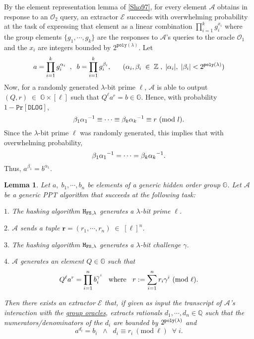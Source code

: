 \documentclass[11pt, lettersize, notitlepage, leqno, footskip=0.6cm]{article}
\newcommand{\bz}{\mathbb Z}
\newcommand{\bq}{\mathbb Q}
\newcommand{\pl}{\prod\limits}
\newcommand{\slim}{\sum\limits}
\newcommand{\ttt}{\texttt}
\newcommand{\bG}{\mathbb{G}}
\newcommand{\mc}{\mathcal}
\newcommand{\mb}{\mathbb}
\newcommand{\mbf}{\mathbf}
\newcommand{\al}{\alpha}
\newcommand{\be}{\beta}
\newcommand{\lam}{\lambda}
\newcommand{\A}{\mc{A}}
\newcommand{\vs}{\vspace{-0.15cm}}
\newcommand{\noin}{\noindent}
\newcommand{\op}{overwhelming probability}
\newcommand{\Mod}[1]{\ (\mathrm{mod}\ #1)}
\newcommand{\E}{\mc{E}}
\newtheorem{Lem}[Thm]{Lemma}
\numberwithin{equation}{section}
\begin{document}
\begin{prf} By the element representation lemma of \hyperlink{Sho97}{[Sho97]}, for every element $\mc{A}$ obtains in response to an $\mc{O}_2$ query, an extractor $\E$ succeeds with overwhelming probability at the task of expressing that element as a linear combination $\prod_{i=1}^k g_i^{x_i}$ where the group elements $\{g_1,\cdots,g_k\}$ are the responses to $\A$'s queries to the oracle $\mc{O}_1$ and the $x_i$ are integers bounded by $2^{\ttt{poly}(\lam)}$. Let \vspace{-0.3cm} $$a = \pl_{i=1}^k g_i^{\al_i}\;\;,\;\; b = \pl_{i=1}^k g_i^{\be_i},\;\;\;\;\;\;(\al_i,\be_i\;\in\;\bz\;,\;|\al_i|,\;|\be_{i}| < 2^{\ttt{poly}(\lam)})\vs $$ Now, for a randomly generated $\lam$-bit prime $\ell$, $\mc{A}$ is able to output $(Q, r)\; \in\;\bG \times [\ell]$ such that $Q^{\ell}a^r = b\in \bG$. Hence, with probability $1-\ttt{Pr}[\ttt{DLOG}]$,  \vs $${\be_1}{\al_1}^{-1}\equiv\cdots\equiv {\be_k}{\al_k}^{-1}\equiv r \Mod{l}.\vs $$ Since the $\lam$-bit prime $\ell$ was randomly generated, this implies that with \op, \vs $${\be_1}{\al_1}^{-1} = \cdots =  {\be_k}{\al_k}^{-1}.\vs $$ Thus, $a^{\be_1} = b^{\al_1}$. \end{prf}
\vspace{0.1cm}



\begin{Lem} \label{aggroot} Let $a,\; b_1,\cdots,b_n$ be elements of a generic hidden order group $\bG$. Let $\mc{A}$ be a generic PPT algorithm that succeeds at the following task:

\noin $1.$ The hashing algorithm ${\tt{H}}_{{\tt{FS}},\lam}$ generates a $\lam$-bit prime $\ell$.

\noin $2.$ $\mc{A}$ sends a tuple $\mbf{r} = (r_1,\cdots,r_n)\;\in\; [\ell]^n$.

\noin $3.$ The hashing algorithm ${\tt{H}}_{{\tt{FS}},\lam}$ generates a $\lam$-bit challenge $\gamma$.

\noin $4.$ $\mc{A}$ generates an element $Q\in \mb{G}$ such that \vs $$Q^{\ell}a^r = \pl_{i=1}^n b_i^{\gamma^i}\;\;\text{ where }\;\; r:= \slim_{i=1}^n r_i\gamma^i\Mod{\ell}. \vs $$

\noin Then there exists an extractor \hspace{0.05cm}$\E$ that, if given as input the transcript of $\A$'s interaction with the \hyperlink{Oracles}{group oracles}, extracts rationals $d_1,\cdots,d_n\in\bq$ such that the numerators/denominators of the $d_i$ are bounded by $2^{\tt{poly}(\lam)}$ and \vspace{-0.25cm} $$a^{d_i} = b_i \;\;\wedge\;\; d_i\equiv r_i\Mod{\ell}\;\;\forall\;i. $$ \end{Lem} 
\end{document}
